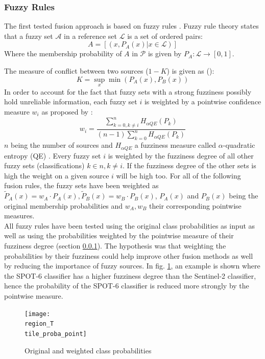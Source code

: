 \documentclass[10pt]{article}
\newcommand{\tile}{41000_30000}
\newcommand{\region}{finistere}
\begin{document}
\subsubsection{Fuzzy Rules}\label{sec:fuzzyLogic}
The first tested fusion approach is based on fuzzy rules \cite{zadeh_fuzzy_1965}. Fuzzy rule theory states that a fuzzy set $\mathcal{A}$ in a reference set $\mathcal{L}$ is a set of ordered pairs:
\begin{equation}
    A=[(x,P_A(x)|x\in \mathcal{L})]
\end{equation}
Where the membership probability of $A$ in $\mathcal{P}$ is given by $P_A:\mathcal{L}\rightarrow[0,1]$.

The measure of conflict between two sources ($1-K$) is given as (\cite{ouerghemmi_two-step_2017,dubois_possibility}):
\begin{equation}
    K=\sup_x\min(P_A(x), P_B(x))
\end{equation}
In order to account for the fact that fuzzy sets with a strong fuzziness possibly hold unreliable information, each fuzzy set $i$ is weighted by a pointwise confidence measure $w_i$ as proposed by \cite{fauvel_decision_fusion}:
\begin{equation}
    w_i=\frac{\sum_{k=0,k\neq i}^{n}H_{\alpha QE}(P_k)}{(n-1)\sum_{k=0}^{n}H_{\alpha QE}(P_k)}
\end{equation}
$n$ being the number of sources and $H_{\alpha QE}$ a fuzziness measure called $\alpha$-quadratic entropy (QE) \parencite{pal_measuring_1994}. Every fuzzy set $i$ is weighted by the fuzziness degree of all other fuzzy sets (classifications) $k\in n,k\neq i$. If the fuzziness degree of the other sets is high the weight on a given source $i$ will be high too. For all of the following fusion rules, the fuzzy sets have been weighted as $\tilde{P}_A(x)=w_A\cdot P_A(x), \tilde{P}_B(x)=w_B\cdot P_B(x)$, $P_A(x)$ and $P_B(x)$ being the original membership probabilities and $w_A, w_B$ their corresponding pointwise measures.\\

All fuzzy rules have been tested using the original class probabilities as input  as well as using the probabilities weighted by the pointwise measure of their fuzziness degree (section \ref{sec:fuzzyLogic}). The hypothesis was that weighting the probabilities by their fuzziness could help improve other fusion methods as well by reducing the importance of fuzzy sources. In fig. \ref{fig:proba_point}, an example is shown where the SPOT-6 classifier has a higher fuzziness degree than the Sentinel-2 classifier, hence the probability of the SPOT-6 classifier is reduced more strongly by the pointwise measure.
\begin{figure}[H]
    \centering
    \texttt{[image: \\region\_T\\tile\_proba\_point]}
    \caption{Original and weighted class probabilities}
    \label{fig:proba_point}
\end{figure}
\end{document}

